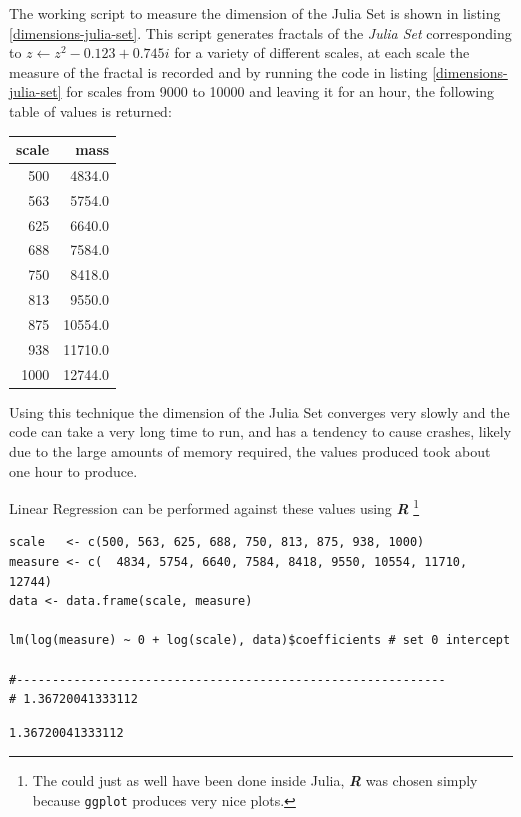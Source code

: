 \documentclass[a4paper,11pt,twoside]{article}
\begin{document}
The working script to measure the dimension of the Julia Set is shown in listing
\ref{dimensions-julia-set}. This script generates fractals of the \emph{Julia Set}
corresponding to \(z \leftarrow z^{2} -0.123+0.745i\) for a variety of different
scales, at each scale the measure of the fractal is recorded and by running the code in listing \ref{dimensions-julia-set}
for scales from 9000 to 10000 and leaving it for an hour, the following
table of values is returned:

\begin{center}
\begin{tabular}{rr}
scale & mass\\
\hline
500 & 4834.0\\
563 & 5754.0\\
625 & 6640.0\\
688 & 7584.0\\
750 & 8418.0\\
813 & 9550.0\\
875 & 10554.0\\
938 & 11710.0\\
1000 & 12744.0\\
\end{tabular}

\end{center}


Using this technique the dimension of the Julia Set converges very slowly and
the code can take a very long time to run, and has a tendency to cause crashes,
likely due to the large amounts of memory required, the values produced took
about one hour to produce.

Linear Regression can be performed against these values using \textbf{\emph{R}} \footnote{The could just as well have been done inside Julia, \textbf{\emph{R}} was chosen simply because \texttt{ggplot} produces very nice plots.}

\begin{verbatim}
scale   <- c(500, 563, 625, 688, 750, 813, 875, 938, 1000)
measure <- c(  4834, 5754, 6640, 7584, 8418, 9550, 10554, 11710, 12744)
data <- data.frame(scale, measure)

lm(log(measure) ~ 0 + log(scale), data)$coefficients # set 0 intercept

#------------------------------------------------------------
# 1.36720041333112
\end{verbatim}

\begin{verbatim}
1.36720041333112
\end{verbatim}
\end{document}

